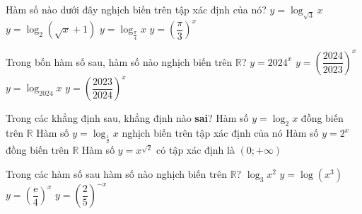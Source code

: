 \begin{ex}%
	Hàm số nào dưới đây nghịch  biến trên tập xác định của nó?
	 \choice
		{$y=\log_{\sqrt{3}}x$} 
		 {$y=\log_2\left(\sqrt{x}+1\right)$}
		{\True $y=\log_{\frac{\pi}{4}}x$} 
		 {$y=\left(\dfrac{\pi}{3}\right)^x$}
\end{ex}

\begin{ex}%
	 Trong bốn hàm số sau, hàm số nào nghịch biến trên $\mathbb{R}$?
	 \choice
		 {$y=2024^x$}
		{$y=\left(\dfrac{2024}{2023}\right)^x$} 
		 {$y=\log_{2024}x$}
		{\True $y=\left(\dfrac{2023}{2024}\right)^x$} 
\end{ex}

\begin{ex}%
	Trong các khẳng định sau,  khẳng định nào \textbf{sai}?
	 \choice
		{\True Hàm số $y = \log_{2}x$ đồng biến trên $\mathbb{R}$} 
		{Hàm số $y = \log_{\frac{1}{2}}x$ nghịch biến  trên tập xác định của nó}
		{Hàm số  $y = 2^x$ đồng biến trên $\mathbb{R}$}
		{Hàm số $y = x^{\sqrt{2}}$ có tập xác định là $\left(0;  +\infty\right)$}
\end{ex}

\begin{ex}%
	Trong các hàm số sau hàm số nào nghịch biến trên $\mathbb{R}$? 
	 \choice
		 {${\log }_{3}{x^2}$}
		{$y=\log \left(x^3\right)$} 
		{\True $y=\left( \dfrac{\mathrm{e}}{4}  \right)^x$}
		 {$y=\left( \dfrac2{5} \right)^{-x}$}
\end{ex}

